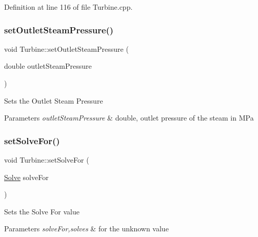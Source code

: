 Definition at line 116 of file Turbine.\+cpp.

\mbox{\label{class_turbine_ab9612657de02e4523492b687917b4091}} 
\subsubsection{\texorpdfstring{set\+Outlet\+Steam\+Pressure()}{setOutletSteamPressure()}\hspace{0.1cm}{\footnotesize\ttfamily [3/3]}}
{\footnotesize\ttfamily void Turbine\+::set\+Outlet\+Steam\+Pressure (\begin{DoxyParamCaption}\item[{double}]{outlet\+Steam\+Pressure }\end{DoxyParamCaption})}

Sets the Outlet Steam Pressure


\begin{DoxyParams}{Parameters}
{\em outlet\+Steam\+Pressure} & double, outlet pressure of the steam in M\+Pa \\
\hline
\end{DoxyParams}
\mbox{\label{class_turbine_a96f54a8fc572dae6c5298289de890f4d}} 
\subsubsection{\texorpdfstring{set\+Solve\+For()}{setSolveFor()}\hspace{0.1cm}{\footnotesize\ttfamily [1/3]}}
{\footnotesize\ttfamily void Turbine\+::set\+Solve\+For (\begin{DoxyParamCaption}\item[{\hyperlink{class_turbine_a9fd7beba6c6f071e228fbe3e07969d2b}{Solve}}]{solve\+For }\end{DoxyParamCaption})}

Sets the Solve For value


\begin{DoxyParams}{Parameters}
{\em solve\+For,solves} & for the unknown value \\
\hline
\end{DoxyParams}
\mbox{\label{class_turbine_a96f54a8fc572dae6c5298289de890f4d}} 
